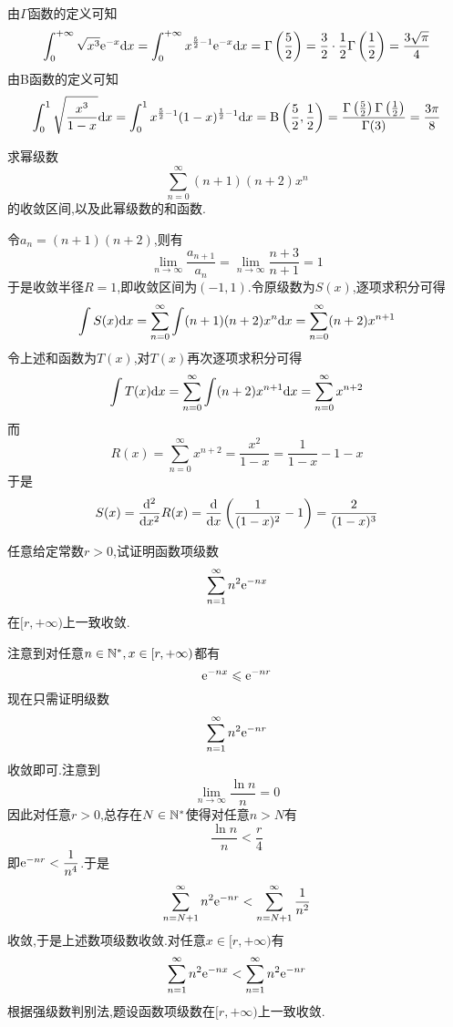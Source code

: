 \documentclass{ctexart}
\begin{document}
\begin{solution}
    由$\Gamma$函数的定义可知
    \[\int_0^{+\infty}\sqrt{x^3}\mathrm{e}^{-x}\mathrm{d} x
    =\int_0^{+\infty}x^{\frac52-1}\mathrm{e}^{-x}\mathrm{d} x
    =\Gamma\left(\dfrac52\right)
    =\dfrac32\cdot\dfrac12\Gamma\left(\dfrac12\right)
    =\dfrac{3\sqrt\pi}{4}\]
    由B函数的定义可知
    \[\int_0^1\sqrt{\dfrac{x^3}{1-x}}\mathrm{d} x
    =\int_0^1x^{\frac52-1}(1-x)^{\frac12-1}\mathrm{d} x
    =\text{B}\left(\dfrac52,\dfrac12\right)
    =\dfrac{\Gamma\left(\frac52\right)\Gamma\left(\frac12\right)}{\Gamma(3)}
    =\dfrac{3\pi}{8}\]

\end{solution}
\begin{problem}[4.(10\songti{分})]
    求幂级数
    \[\sum_{n=0}^{\infty}(n+1)(n+2)x^n\]
    的收敛区间,以及此幂级数的和函数.    

\end{problem}
\begin{solution}
    令$a_n=(n+1)(n+2)$,则有
    \[\lim_{n\to\infty}\dfrac{a_{n+1}}{a_n}
    =\lim_{n\to\infty}\dfrac{n+3}{n+1}=1\]
    于是收敛半径$R=1$,即收敛区间为$(-1,1)$.令原级数为$S(x)$,逐项求积分可得
    \[\int S(x)\mathrm{d} x=\sum_{n=0}^{\infty}\int(n+1)(n+2)x^n\mathrm{d} x=\sum_{n=0}^{\infty}(n+2)x^{n+1}\]
    令上述和函数为$T(x)$,对$T(x)$再次逐项求积分可得
    \[\int T(x)\mathrm{d} x=\sum_{n=0}^{\infty}\int(n+2)x^{n+1}\mathrm{d} x=\sum_{n=0}^{\infty}x^{n+2}\]
    而
    \[R(x)=\sum_{n=0}^{\infty}x^{n+2}=\dfrac{x^2}{1-x}=\dfrac{1}{1-x}-1-x\]
    于是
    \[S(x)=\dfrac{\mathrm{d}^2}{\mathrm{d} x^2}R(x)
    =\dfrac{\mathrm{d}}{\mathrm{d} x}\left(\dfrac{1}{(1-x)^2}-1\right)
    =\dfrac{2}{(1-x)^3}\]

\end{solution}
\begin{problem}[5.(10\songti{分})]
    任意给定常数$r>0$,试证明函数项级数
    \[\sum_{n=1}^\infty n^2\mathrm{e}^{-nx}\]
    在$[r,+\infty)$上一致收敛.
\end{problem}
\begin{solution}
    注意到对任意$n\in\mathbb{N}^*,x\in[r,+\infty)$都有
    \[\mathrm{e}^{-nx}\leqslant\mathrm{e}^{-nr}\]
    现在只需证明级数
    \[\sum_{n=1}^{\infty}n^2\mathrm{e}^{-nr}\]
    收敛即可.注意到
    \[\lim_{n\to\infty}\dfrac{\ln n}{n}=0\]
    因此对任意$r>0$,总存在$N\in\mathbb{N}^*$使得对任意$n>N$有
    \[\dfrac{\ln n}{n}<\dfrac{r}{4}\]
    即$\mathrm{e}^{-nr}<\dfrac{1}{n^4}$.于是
    \[\sum_{n=N+1}^{\infty}n^2\mathrm{e}^{-nr}<\sum_{n=N+1}^{\infty}\dfrac1{n^2}\]
    收敛,于是上述数项级数收敛.对任意$x\in[r,+\infty)$有
    \[\sum_{n=1}^\infty n^2\mathrm{e}^{-nx}<\sum_{n=1}^{\infty}n^2\mathrm{e}^{-nr}\]
    根据强级数判别法,题设函数项级数在$[r,+\infty)$上一致收敛.
\end{solution}
\end{document}
